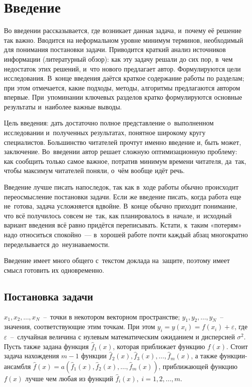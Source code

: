 \documentclass[12pt, fleqn]{article}
\newcommand{\predictionfunction}{\hat{f}}
\newcommand{\ensemblefunction}{a}
\newcommand{\numberobjects}{N}
\newcommand{\numberpredictionfunctions}{m}
\newcommand{\many}[3]{#1 1 #2, #1 2 #2, \dots, #1 #3 #2}  %
\newcommand{\ensemblefunctionfull}{\ensemblefunction(\many{\predictionfunction_}{(x)}{\numberpredictionfunctions})}
\begin{document}
\newpage
\section{Введение}

Во введении рассказывается, где возникает данная задача, и~почему её решение так важно.
Вводится на неформальном уровне минимум терминов, необходимый для понимания постановки задачи.
Приводится краткий анализ источников информации (литературный обзор):
как эту задачу решали до сих пор, в~чем недостаток этих решений, и~что нового предлагает автор.
Формулируются цели исследования. 
В~конце введения даётся краткое содержание работы по разделам; 
при этом отмечается, какие подходы, методы, алгоритмы предлагаются автором впервые. 
При~упоминании ключевых разделов кратко формулируются основные результаты и~наиболее важные выводы.

Цель введения: дать достаточно полное представление о~выполненном исследовании 
и~полученных результатах, понятное широкому кругу специалистов. 
Большинство читателей прочтут именно введение и, быть может, заключение. 
Во~введении автор решает сложную оптимизационную проблему: 
как сообщить только самое важное, потратив минимум времени читателя,
да~так, чтобы максимум читателей поняли, о~чём вообще идёт речь.

Введение лучше писать напоследок, так как в~ходе работы обычно происходит переосмысление постановки задачи.
Если же введение писать, когда работа еще не~готова, задача усложняется вдвойне.
В~конце обычно приходит понимание, что всё получилось совсем не~так, как планировалось в~начале,
и~исходный вариант введения всё равно придётся переписывать. 
Кстати, к~таким «потерям» надо относиться спокойно~--- в~хорошей работе почти каждый абзац многократно переделывается до~неузнаваемости.
 
Введение имеет много общего с~текстом доклада на~защите, поэтому имеет смысл готовить их одновременно.

\subsection{Постановка задачи}

$\many{x_}{}{\numberobjects}$~--~точки в некотором векторном пространстве; $\many{y_}{}{\numberobjects}$~--~ значения, соответствующие этим точкам. При этом $y_i = y(x_i) = f(x_i) + \varepsilon$, где $\varepsilon$~--~случайная величина с нулевым математическим ожиданием и дисперсией $\sigma^2$. Пусть также задана функция $\predictionfunction_1(x)$, которая приближает функцию $f(x)$. Стоит задача нахождения $\numberpredictionfunctions - 1$ функции $\predictionfunction_2(x), \predictionfunction_3(x), \dots, \predictionfunction_\numberpredictionfunctions(x)$, а также функции-ансамбля $\predictionfunction(x) = \ensemblefunctionfull$, приближающей функцию $f(x)$ лучше чем любая из функций $\predictionfunction_i(x), \; i = \many{}{}{\numberpredictionfunctions}$.
\end{document}
